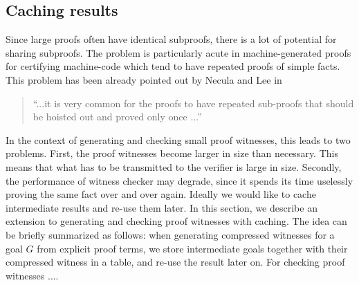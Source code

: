 \documentclass{llncs}
\begin{document}


\subsection{Caching results}
\label{sec:tabling}
Since large proofs often have identical subproofs,  there is a
lot of potential for sharing subproofs. The problem is particularly
acute in machine-generated proofs for certifying machine-code which
tend to have repeated proofs of simple facts. This problem has been
already pointed out by Necula and Lee in \cite{NeculaLee+97:resource}

\begin{quote}
``...it is very common for the proofs to have  
repeated sub-proofs that should be hoisted out and 
proved only once ...'' \cite{NeculaLee+97:resource}
 \end{quote}


In the context of generating and checking small proof witnesses, this
leads to two problems.  First, the proof witnesses become larger in size than
necessary. This means that what has to be transmitted to the verifier
is large in size. Secondly, the performance of witness checker may
degrade, since it spends its time uselessly proving the same fact over
and over again. Ideally we would like to cache intermediate results
and re-use them later. In this section, we describe an extension to
generating and checking proof witnesses with caching. The idea can be
briefly summarized as follows: when generating compressed witnesses
for a goal $G$ from explicit proof terms, we store intermediate goals
together with their compressed witness in a table, and re-use the
result later on. For checking proof witnesses $\ldots$.
\end{document}
